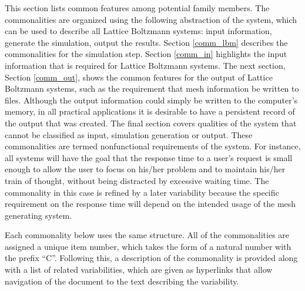 \documentclass[12pt, notitlepage]{article}
\begin{document}
This section lists common features among potential family members. The commonalities are organized using the following abstraction of the system, which can be used to describe all Lattice Boltzmann systems: input information, generate the simulation, output the results. Section \ref{comm_lbm} describes the commonalities for the simulation step. Section \ref{comm_in} highlights the input information that is required for Lattice Boltzmann systems. The next section, Section \ref{comm_out}, shows the common features for the output of Lattice Boltzmann systems, such as the requirement that mesh information be written to files. Although the output information could simply be written to the computer’s memory, in all practical applications it is desirable to have a persistent record of the output that was created. The final section covers qualities of the system that cannot be classified as input, simulation generation or output. These commonalities are termed nonfunctional requirements of the system. For instance, all systems will have the goal that the response time to a user’s request is small enough to allow the user to focus on his/her problem and to maintain his/her train of thought, without being distracted by excessive waiting time. The commonality in this case is refined by a later variability because the specific requirement on the response time will depend on the intended usage of the mesh generating system. 

Each commonality below uses the same structure. All of the commonalities are assigned a unique item number, which takes the form of a natural number with the prefix ``C''. Following this, a description of the commonality is provided along with a list of related variabilities, which are given as hyperlinks that allow navigation of the document to the text describing the variability.  
\end{document}
